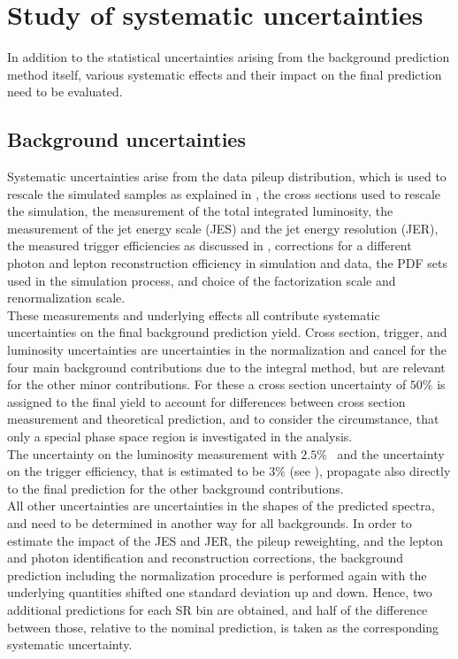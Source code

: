 \section{Study of systematic uncertainties}\label{sec:Syst}
In addition to the statistical uncertainties arising from the background prediction method itself, various systematic effects and their impact on the final prediction need to be evaluated.

\subsection{Background uncertainties}
Systematic uncertainties arise from the data pileup distribution, which is used to rescale the simulated samples as explained in , the cross sections used to rescale the simulation, the measurement of the total integrated luminosity, the measurement of the jet energy scale (JES) and the jet energy resolution (JER), the measured trigger efficiencies as discussed in , corrections for a different photon and lepton reconstruction efficiency in simulation and data, the PDF sets used in the simulation process, and choice of the factorization scale and renormalization scale.\\
These measurements and underlying effects all contribute systematic uncertainties on the final background prediction yield. Cross section, trigger, and luminosity uncertainties are uncertainties in the normalization and cancel for the four main background contributions due to the integral method, but are relevant for the other minor contributions. For these a cross section uncertainty of $50\%$ is assigned to the final yield to account for differences between cross section measurement and theoretical prediction, and to consider the circumstance, that only a special phase space region is investigated in the analysis.\\
The uncertainty on the luminosity measurement with $2.5\%$~\cite{LumiUncert} and the uncertainty on the trigger efficiency, that is estimated to be $3\%$ (see ), propagate also directly to the final prediction for the other background contributions.\\
All other uncertainties are uncertainties in the shapes of the predicted spectra, and need to be determined in another way for all backgrounds. In order to estimate the impact of the JES and JER, the pileup reweighting, and the lepton and photon identification and reconstruction corrections, the background prediction including the normalization procedure is performed again with the underlying quantities shifted one standard deviation up and down. Hence, two additional predictions for each SR bin are obtained, and half of the difference between those, relative to the nominal prediction, is taken as the corresponding systematic uncertainty.\\
